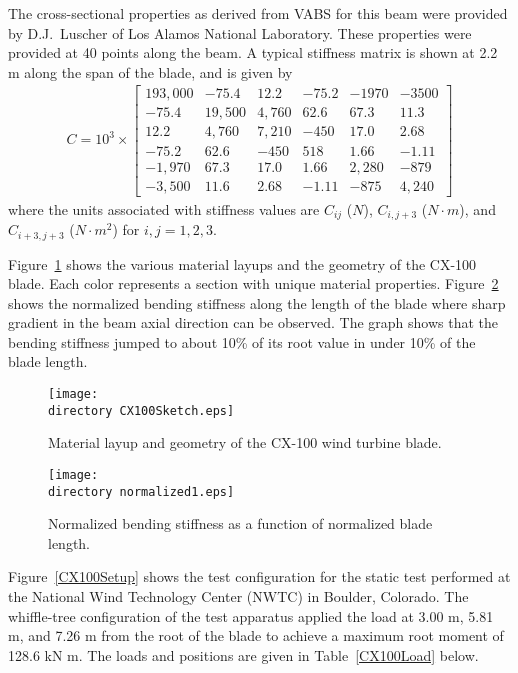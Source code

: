 \documentclass{aiaa-tc}
\def\directory{EPSF/}
\begin{document}
The cross-sectional properties as derived from VABS for this beam were provided by D.J.\ Luscher of Los Alamos National Laboratory. These properties were provided at 40 points along the beam. A typical stiffness matrix is shown at 2.2 m along the span of the blade, and is given by
\begin{align*}
C =10^3 \times \begin{bmatrix}
	193,000 & -75.4   & 12.2   & -75.2  & -1970    & -3500    \\
	-75.4  & 19,500 & 4,760   & 62.6  & 67.3    & 11.3    \\
	12.2  & 4,760   & 7,210 & -450  & 17.0    & 2.68    \\
	-75.2  & 62.6   & -450   & 518 & 1.66    & -1.11    \\
	-1,970  & 67.3   & 17.0   & 1.66  & 2,280 & -879    \\
	-3,500  & 11.6   & 2.68   & -1.11  & -875    & 4,240
\end{bmatrix}
\end{align*}
where the units associated with stiffness values are $C_{ij}$ ($N$), $C_{i,j+3}$ ($N \cdot m$), and $C_{i+3,j+3}$ ($N \cdot m^2$) for $i,j = 1,2,3$.

Figure~\ref{CX100Sketch} shows the various material layups and the geometry of the CX-100 blade. Each color represents a section with unique material properties. Figure~\ref{normalized1} shows the normalized bending stiffness along the length of the blade where sharp gradient in the beam axial direction can be observed. The graph shows that the bending stiffness jumped to about 10\% of its root value in under 10\% of the blade length.

\begin{figure}
\centering
\texttt{[image: \\directory CX100Sketch.eps]}
\caption{Material layup and geometry of the CX-100 wind turbine blade\cite{paquette2006modeling}.} 
\label{CX100Sketch}
\end{figure}

\begin{figure}
\centering
\texttt{[image: \\directory normalized1.eps]}
\caption{Normalized bending stiffness as a function of normalized blade length.} 
\label{normalized1}
\end{figure}

Figure~\ref{CX100Setup} shows the test configuration for the static test performed at the National Wind Technology Center (NWTC) in Boulder, Colorado. The whiffle-tree configuration of the test apparatus applied the load at 3.00 m, 5.81 m, and 7.26 m from the root of the blade to achieve a maximum root moment of 128.6 kN m. The loads and positions are given in Table~\ref{CX100Load} below.
\end{document}
